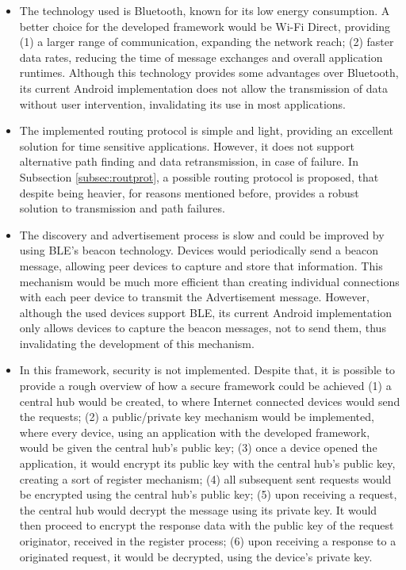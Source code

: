 \begin{itemize}
	\item The technology used is Bluetooth, known for its low energy consumption. A better choice for the developed framework would be Wi-Fi Direct, providing (1) a larger range of communication, expanding the network reach; (2) faster data rates, reducing the time of message exchanges and overall application runtimes. Although this technology provides some advantages over Bluetooth, its current Android implementation does not allow the transmission of data without user intervention, invalidating its use in most applications.
	
	\item The implemented routing protocol is simple and light, providing an excellent solution for time sensitive applications. However, it does not support alternative path finding and data retransmission, in case of failure. In Subsection \ref{subsec:routprot}, a possible routing protocol is proposed, that despite being heavier, for reasons mentioned before, provides a robust solution to transmission and path failures.
	
	\item The discovery and advertisement process is slow and could be improved by using \gls{BLE}'s beacon technology. Devices would periodically send a beacon message, allowing peer devices to capture and store that information. This mechanism would be much more efficient than creating individual connections with each peer device to transmit the Advertisement message. However, although the used devices support \gls{BLE}, its current Android implementation only allows devices to capture the beacon messages, not to send them, thus invalidating the development of this mechanism.
	
	\item In this framework, security is not implemented. Despite that, it is possible to provide a rough overview of how a secure framework could be achieved (1) a central hub would be created, to where Internet connected devices would send the requests; (2) a public/private key mechanism would be implemented, where every device, using an application with the developed framework, would be given the central hub's public key; (3) once a device opened the application, it would encrypt its public key with the central hub's public key, creating a sort of register mechanism; (4) all subsequent sent requests would be encrypted using the central hub's public key; (5) upon receiving a request, the central hub would decrypt the message using its private key. It would then proceed to encrypt the response data with the public key of the request originator, received in the register process; (6) upon receiving a response to a originated request, it would be decrypted, using the device's private key.
	

\end{itemize}
